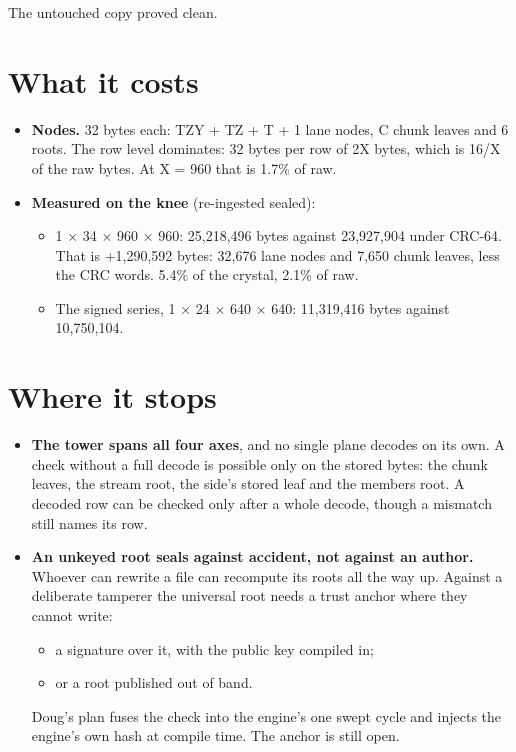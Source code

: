 The untouched copy proved clean.

\section{\texorpdfstring{What it costs}{What it costs}}

\begin{itemize}
\item \textbf{Nodes.} 32 bytes each: TZY + TZ + T + 1 lane nodes, C chunk leaves and 6 roots. The row level dominates: 32 bytes per row of 2X bytes, which is 16/X of the raw bytes. At X = 960 that is 1.7\% of raw.
\item \textbf{Measured on the knee} (re-ingested sealed):

\begin{itemize}
\item 1 × 34 × 960 × 960: 25,218,496 bytes against 23,927,904 under CRC-64. That is +1,290,592 bytes: 32,676 lane nodes and 7,650 chunk leaves, less the CRC words. 5.4\% of the crystal, 2.1\% of raw.
\item The signed series, 1 × 24 × 640 × 640: 11,319,416 bytes against 10,750,104.
\end{itemize}
\end{itemize}

\section{\texorpdfstring{Where it stops}{Where it stops}}

\begin{itemize}
\item \textbf{The tower spans all four axes}, and no single plane decodes on its own. A check without a full decode is possible only on the stored bytes: the chunk leaves, the stream root, the side's stored leaf and the members root. A decoded row can be checked only after a whole decode, though a mismatch still names its row.
\item \textbf{An unkeyed root seals against accident, not against an author.} Whoever can rewrite a file can recompute its roots all the way up. Against a deliberate tamperer the universal root needs a trust anchor where they cannot write:

\begin{itemize}
\item a signature over it, with the public key compiled in;
\item or a root published out of band.
\end{itemize}

Doug's plan fuses the check into the engine's one swept cycle and injects the engine's own hash at compile time. The anchor is still open.
\end{itemize}

